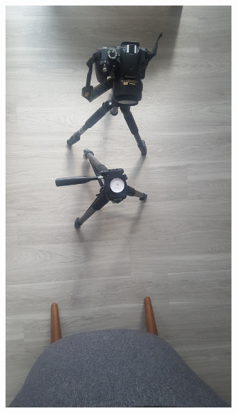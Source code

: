 \documentclass[letterpaper,12pt]{article}
\begin{document}
\begin{figure}[h]
\begin{subfigure}[b]{0.3\textwidth}
        \includegraphics[width=0.95\textwidth]{Study_BGDist_Near.JPG}
        \caption{}
        \label{fig:Study_BGDist_Near}
    \end{subfigure}
    

\end{figure}
\end{document}
